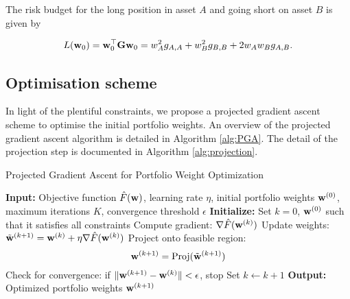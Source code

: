 \documentclass{article} %
\theoremstyle{plain}
\theoremstyle{definition} %
\begin{document}
The risk budget for the long position in asset $A$ and going short on asset $B$ is given by

\begin{align*}
  L({\bf w}_0) = {\bf w}_0^\top {\bf G} {\bf w}_0 = w_A^2 g_{A,A} + w_B^2 g_{B,B} + 2 w_A w_B g_{A,B}.
\end{align*}




\subsection{Optimisation scheme}
In light of the plentiful constraints, we propose a projected gradient ascent scheme to optimise the initial portfolio weights. 
 An overview of the projected gradient ascent algorithm is detailed in Algorithm \ref{alg:PGA}. 
 The detail of the projection step is documented in Algorithm \ref{alg:projection}.
\begin{algorithm}[th]
  \caption{Projected Gradient Ascent for Portfolio Weight Optimization}\label{alg:PGA}
  \begin{algorithmic}[1]
  \STATE \textbf{Input:} Objective function $\hat F({\bf w})$, learning rate $\eta$, initial portfolio weights ${\bf w}^{(0)}$, maximum iterations $K$, convergence threshold $\epsilon$
  \STATE \textbf{Initialize:} Set $k = 0$, ${\bf w}^{(0)}$ such that it satisfies all constraints
      \STATE Compute gradient: $\nabla \hat F({\bf w}^{(k)})$
      \STATE Update weights: $\tilde{\bf w}^{(k+1)} = {\bf w}^{(k)} + \eta \nabla \hat F({\bf w}^{(k)})$
      \STATE Project onto feasible region:
      \[
        {\bf w}^{(k+1)} = \text{Proj}(\tilde{\bf w}^{(k+1)})
      \]
      \STATE Check for convergence: if $\|{\bf w}^{(k+1)} - {\bf w}^{(k)} \| < \epsilon$, stop
      \STATE Set $k \leftarrow k + 1$
  \ENDWHILE
  \STATE \textbf{Output:} Optimized portfolio weights ${\bf w}^{(k+1)}$
  \end{algorithmic}
  \end{algorithm}
  
\end{document}
